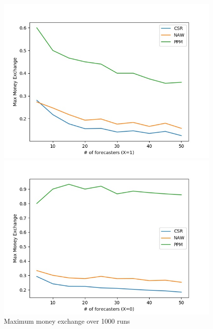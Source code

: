 \documentclass[english,10pt]{article}
\begin{document}
\begin{enumerate}
\begin{enumerate}
        	\begin{figure}[H]
        	\centering
        	\begin{minipage}{0.48\textwidth}
        	\includegraphics[width = \textwidth]{(Beta_1_0dot2)Max_MnEx(X=1).jpg}
        	\end{minipage}
        	\begin{minipage}{0.48\textwidth}
        	\includegraphics[width = \textwidth]{(Beta_1_0dot2)Max_MnEx(X=0).jpg}
        	\end{minipage}
        	\caption{Maximum money exchange over 1000 runs}
        	\end{figure}
        	

\end{enumerate}
\end{enumerate}
\end{document}
